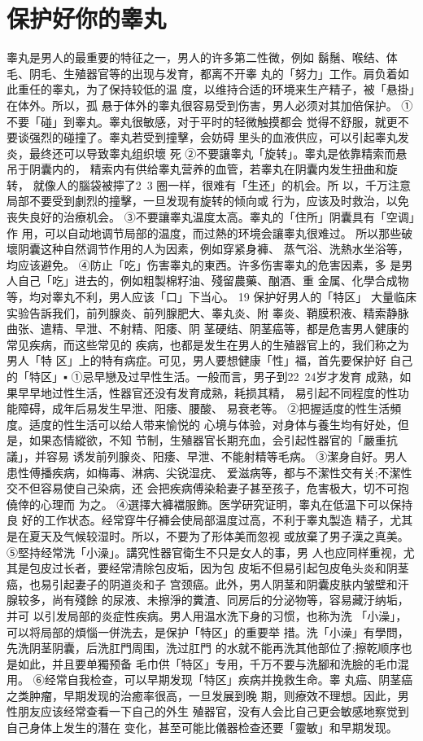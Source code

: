 \documentclass[12pt,UTF8]{ctexbook}
\begin{document}
\section{保护好你的睾丸}
睾丸是男人的最重要的特征之一，男人的许多第二性微，例如
鬍鬚、喉结、体毛、阴毛、生殖器官等的出现与发育，都离不开睾
丸的「努力」工作。肩负着如此重任的睾丸，为了保持较低的温
度，以维持合适的环境来生产精子，被「悬掛」在体外。所以，孤
悬于体外的睾丸很容易受到伤害，男人必须对其加倍保护。
①不要「碰」到睾丸。睾丸很敏感，对于平时的轻微触摸都会
觉得不舒服，就更不要谈强烈的碰撞了。睾丸若受到撞擊，会妨碍
里头的血液供应，可以引起睾丸发炎，最终还可以导致睾丸组织壞
死
②不要讓睾丸「旋转」。睾丸是依靠精索而悬吊于阴囊内的，
精索内有供给睾丸营养的血管，若睾丸在阴囊内发生扭曲和旋转，
就像人的腦袋被擰了2~3 圈一样，很难有「生还」的机会。所
以，千万注意局部不要受到劇烈的撞擊，一旦发现有旋转的倾向或
行为，应该及时救治，以免丧失良好的治療机会。
③不要讓睾丸温度太高。睾丸的「住所」阴囊具有「空调」作
用，可以自动地调节局部的温度，而过熱的环境会讓睾丸很难过。
所以那些破壞阴囊这种自然调节作用的人为因素，例如穿紧身褲、
蒸气浴、洗熱水坐浴等，均应该避免。
④防止「吃」伤害睾丸的東西。许多伤害睾丸的危害因素，多
是男人自己「吃」进去的，例如粗製棉籽油、殘留農藥、酗酒、重
金属、化學合成物等，均对睾丸不利，男人应该「口」下当心。
19 保护好男人的「特区」
大量临床实验告訴我们，前列腺炎、前列腺肥大、睾丸炎、附
睾炎、鞘膜积液、精索静脉曲张、遣精、早泄、不射精、阳痿、阴
茎硬结、阴茎癌等，都是危害男人健康的常见疾病，而这些常见的
疾病，也都是发生在男人的生殖器官上的，我们称之为男人「特
区」上的特有病症。可见，男人要想健康「性」福，首先要保护好
自己的「特区」▪
①忌早戀及过早性生活。一般而言，男子到22~24岁才发育
成熟，如果早早地过性生活，性器官还没有发育成熟，耗损其精，
易引起不同程度的性功能障碍，成年后易发生早泄、阳痿、腰酸、
易衰老等。
②把握适度的性生活頻度。适度的性生活可以给人带来愉悦的
心境与体验，对身体与養生均有好处，但是，如果态情縱欲，不知
节制，生殖器官长期充血，会引起性器官的「嚴重抗議」，并容易
诱发前列腺炎、阳痿、早泄、不能射精等毛病。
③潔身自好。男人患性傅播疾病，如梅毒、淋病、尖锐湿疣、
爱滋病等，都与不潔性交有关;不潔性交不但容易使自己染病，还
会把疾病傅染耠妻子甚至孩子，危害极大，切不可抱僥倖的心理而
为之。
④選擇大褲襠服飾。医学研究证明，睾丸在低温下可以保持良
好的工作状态。经常穿牛仔褲会使局部温度过高，不利于睾丸製造
精子，尤其是在夏天及气候较湿时。所以，不要为了形体美而忽视
或放棄了男子漢之真美。
⑤堅持经常洗「小澡」。講究性器官衛生不只是女人的事，男
人也应同样重视，尤其是包皮过长者，要经常清除包皮垢，因为包
皮垢不但易引起包皮龟头炎和阴茎癌，也易引起妻子的阴道炎和子
宫颈癌。此外，男人阴茎和阴囊皮肤内皱壁和汗腺较多，尚有殘餘
的尿液、未擦淨的糞渣、同房后的分泌物等，容易藏汙纳垢，并可
以引发局部的炎症性疾病。男人用温水洗下身的习惯，也称为洗
「小澡」，可以将局部的煩惱一併洗去，是保护「特区」的重要举
措。洗「小澡」有學問，先洗阴茎阴囊，后洗肛門周围，洗过肛門
的水就不能再洗其他部位了;擦乾顺序也是如此，并且要单獨预备
毛巾供「特区」专用，千万不要与洗腳和洗臉的毛巾混用。
⑥经常自我检查，可以早期发现「特区」疾病并挽救生命。睾
丸癌、阴茎癌之类肿瘤，早期发现的治癒率很高，一旦发展到晚
期，则療效不理想。因此，男性朋友应该经常查看一下自己的外生
殖器官，没有人会比自己更会敏感地察觉到自己身体上发生的潛在
变化，甚至可能比儀器检查还要「靈敏」和早期发现。
\end{document}
